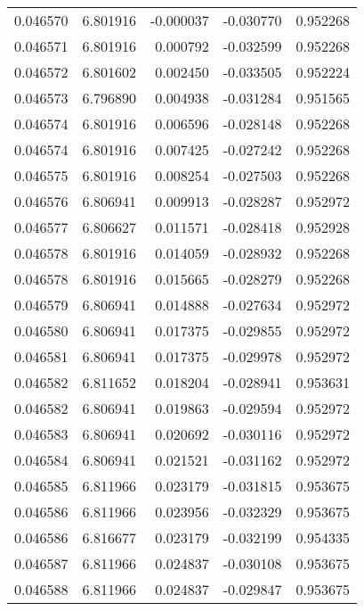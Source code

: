 \begin{tabular}{lrrrr}
0.046570    &  6.801916 & -0.000037 & -0.030770 &             0.952268 \\
0.046571    &  6.801916 &  0.000792 & -0.032599 &             0.952268 \\
0.046572    &  6.801602 &  0.002450 & -0.033505 &             0.952224 \\
0.046573    &  6.796890 &  0.004938 & -0.031284 &             0.951565 \\
0.046574    &  6.801916 &  0.006596 & -0.028148 &             0.952268 \\
0.046574    &  6.801916 &  0.007425 & -0.027242 &             0.952268 \\
0.046575    &  6.801916 &  0.008254 & -0.027503 &             0.952268 \\
0.046576    &  6.806941 &  0.009913 & -0.028287 &             0.952972 \\
0.046577    &  6.806627 &  0.011571 & -0.028418 &             0.952928 \\
0.046578    &  6.801916 &  0.014059 & -0.028932 &             0.952268 \\
0.046578    &  6.801916 &  0.015665 & -0.028279 &             0.952268 \\
0.046579    &  6.806941 &  0.014888 & -0.027634 &             0.952972 \\
0.046580    &  6.806941 &  0.017375 & -0.029855 &             0.952972 \\
0.046581    &  6.806941 &  0.017375 & -0.029978 &             0.952972 \\
0.046582    &  6.811652 &  0.018204 & -0.028941 &             0.953631 \\
0.046582    &  6.806941 &  0.019863 & -0.029594 &             0.952972 \\
0.046583    &  6.806941 &  0.020692 & -0.030116 &             0.952972 \\
0.046584    &  6.806941 &  0.021521 & -0.031162 &             0.952972 \\
0.046585    &  6.811966 &  0.023179 & -0.031815 &             0.953675 \\
0.046586    &  6.811966 &  0.023956 & -0.032329 &             0.953675 \\
0.046586    &  6.816677 &  0.023179 & -0.032199 &             0.954335 \\
0.046587    &  6.811966 &  0.024837 & -0.030108 &             0.953675 \\
0.046588    &  6.811966 &  0.024837 & -0.029847 &             0.953675 \\

\end{tabular}

